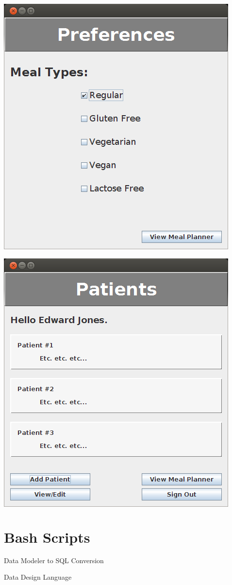 \documentclass[a4paper,10pt,toc=graduated]{article}
\begin{document}
\begin{appendices}
\includegraphics{screenshots/FormUserPreferences.png}

\includegraphics{screenshots/frmDietitionMain.png}
\section{Bash Scripts}
\begin{mySubsection}{Data Modeler to SQL Conversion}

\end{mySubsection}
\begin{mySubsection}{Data Design Language}

\end{mySubsection}

\end{appendices}
\end{document}
